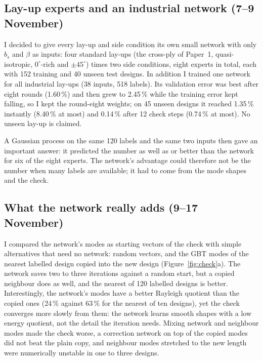 \documentclass[11pt,a4paper]{article}
\newcommand{\pc}{\,\%}
\begin{document}
\subsection{Lay-up experts and an industrial network (7--9 November)}
I decided to give every lay-up and side condition its own small network with only $b_s$ and $\beta$ as inputs: four standard lay-ups (the cross-ply of Paper~1, quasi-isotropic, $0^\circ$-rich and $\pm45^\circ$) times two side conditions, eight experts in total, each with 152 training and 40 unseen test designs. In addition I trained one network for all industrial lay-ups (38 inputs, 518 labels). Its validation error was best after eight rounds (1.60\pc) and then grew to 2.45\pc{} while the training error kept falling, so I kept the round-eight weights; on 45 unseen designs it reached 1.35\pc{} instantly (8.40\pc{} at most) and 0.14\pc{} after 12 check steps (0.74\pc{} at most). No unseen lay-up is claimed.

A Gaussian process on the same 120 labels and the same two inputs then gave an important answer: it predicted the number as well as or better than the network for six of the eight experts. The network's advantage could therefore not be the number when many labels are available; it had to come from the mode shapes and the check.

\subsection{What the network really adds (9--17 November)}
I compared the network's modes as starting vectors of the check with simple alternatives that need no network: random vectors, and the GBT modes of the nearest labelled design copied into the new design (Figure~\ref{fig:check}a). The network saves two to three iterations against a random start, but a copied neighbour does as well, and the nearest of 120 labelled designs is better. Interestingly, the network's modes have a better Rayleigh quotient than the copied ones (24\pc{} against 63\pc{} for the nearest of ten designs), yet the check converges more slowly from them: the network learns smooth shapes with a low energy quotient, not the detail the iteration needs. Mixing network and neighbour modes made the check worse, a correction network on top of the copied modes did not beat the plain copy, and neighbour modes stretched to the new length were numerically unstable in one to three designs.
\end{document}
